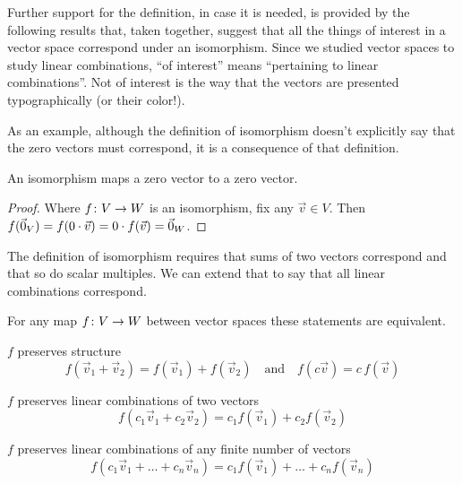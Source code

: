 Further support for the definition, in case it is needed, 
is provided by the following results that, taken together, suggest that
all the things of interest in a vector space
correspond under an isomorphism.
Since we studied vector spaces to study linear combinations,
``of interest'' means ``pertaining to linear combinations''.
Not of interest is the way that the vectors are presented
typographically (or their color!).

As an example, although the definition of isomorphism doesn't explicitly
say that the zero vectors must correspond, 
it is a consequence of that definition.

\begin{lemma}       \label{le:IsoSendsZeroToZero}
An isomorphism maps a zero vector to a zero vector.
\end{lemma}

\begin{proof}
Where \( \mbox{$f\colon V\to W$} \) is an isomorphism, fix any \( \vec{v}\in V \).
Then \( f(\vec{0}_V)=f(0\cdot\vec{v})=0\cdot f(\vec{v})=\vec{0}_W \). 
\end{proof}

The definition of isomorphism requires that sums of two vectors correspond and
that so do scalar multiples.
We can extend that to say that all linear combinations correspond.

\begin{lemma}       \label{le:PresStructIffPresCombos}
For any map \( \mbox{$f\colon V\to W$} \) between vector spaces
these statements are equivalent.
\begin{tfae}
   \item \( f \) preserves structure
     \begin{equation*}
        f(\vec{v}_1+\vec{v}_2)=f(\vec{v}_1)+f(\vec{v}_2)
         \quad\text{and}\quad
        f(c\vec{v})=c\,f(\vec{v})
     \end{equation*}
   \item \( f \) preserves linear combinations of two vectors
     \begin{equation*}
        f(c_1\vec{v}_1+c_2\vec{v}_2)=c_1f(\vec{v}_1)+c_2f(\vec{v}_2)
     \end{equation*}
   \item \( f \) preserves linear combinations of any finite number of 
     vectors
     \begin{equation*}
        f(c_1\vec{v}_1+\dots+c_n\vec{v}_n)=
           c_1f(\vec{v}_1)+\dots+c_nf(\vec{v}_n)
     \end{equation*}
\end{tfae}
\end{lemma}

